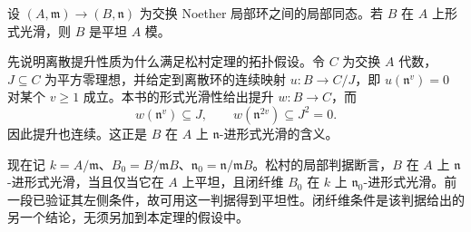 \begin{theorem}\label{b3:thm:local-formal-smooth-flat-external}
	设 \((A,\mathfrak m)\to(B,\mathfrak n)\) 为交换 Noether 局部环之间的局部同态。若 \(B\) 在 \(A\) 上形式光滑，则 \(B\) 是平坦 \(A\) 模。
\end{theorem}

\begin{proofsketch}
	先说明离散提升性质为什么满足松村定理的拓扑假设。令 \(C\) 为交换 \(A\) 代数，\(J\subseteq C\) 为平方零理想，并给定到离散环的连续映射 \(u:B\to C/J\)，即 \(u(\mathfrak n^v)=0\) 对某个 \(v\ge1\) 成立。本书的形式光滑性给出提升 \(w:B\to C\)，而
	\[
		w(\mathfrak n^v)\subseteq J, \qquad w(\mathfrak n^{2v})\subseteq J^2=0.
	\]
	因此提升也连续。这正是 \(B\) 在 \(A\) 上 \(\mathfrak n\)-进形式光滑的含义。

	现在记 \(k=A/\mathfrak m\)、\(B_0=B/\mathfrak mB\)、\(\mathfrak n_0=\mathfrak n/\mathfrak mB\)。松村的局部判据断言，\(B\) 在 \(A\) 上 \(\mathfrak n\)-进形式光滑，当且仅当它在 \(A\) 上平坦，且闭纤维 \(B_0\) 在 \(k\) 上 \(\mathfrak n_0\)-进形式光滑\cite[Theorem 28.9, p. 222]{Matsumura1989CommutativeRingTheory}。前一段已验证其左侧条件，故可用这一判据得到平坦性。闭纤维条件是该判据给出的另一个结论，无须另加到本定理的假设中。
\end{proofsketch}

